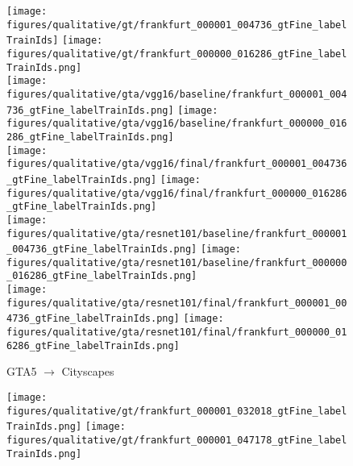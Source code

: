 \begin{figure*}[t]
\begin{subfigure}{.02\linewidth}
	\scriptsize
	\vspace{-1.2em}
	\vspace{3.2em}
	\vspace{2.5em}
\end{subfigure}%
\hspace{0.1em}%
\begin{subfigure}{.49\linewidth}
  \centering
    \texttt{[image: figures/qualitative/gt/frankfurt\_000001\_004736\_gtFine\_labelTrainIds]}
    \texttt{[image: figures/qualitative/gt/frankfurt\_000000\_016286\_gtFine\_labelTrainIds.png]}\\
	\texttt{[image: figures/qualitative/gta/vgg16/baseline/frankfurt\_000001\_004736\_gtFine\_labelTrainIds.png]}
    \texttt{[image: figures/qualitative/gta/vgg16/baseline/frankfurt\_000000\_016286\_gtFine\_labelTrainIds.png]}\\
    \texttt{[image: figures/qualitative/gta/vgg16/final/frankfurt\_000001\_004736\_gtFine\_labelTrainIds.png]}
    \texttt{[image: figures/qualitative/gta/vgg16/final/frankfurt\_000000\_016286\_gtFine\_labelTrainIds.png]}\\
    \texttt{[image: figures/qualitative/gta/resnet101/baseline/frankfurt\_000001\_004736\_gtFine\_labelTrainIds.png]}
    \texttt{[image: figures/qualitative/gta/resnet101/baseline/frankfurt\_000000\_016286\_gtFine\_labelTrainIds.png]}\\
    \texttt{[image: figures/qualitative/gta/resnet101/final/frankfurt\_000001\_004736\_gtFine\_labelTrainIds.png]}
    \texttt{[image: figures/qualitative/gta/resnet101/final/frankfurt\_000000\_016286\_gtFine\_labelTrainIds.png]}
    \caption{\scriptsize GTA5 $\rightarrow$ Cityscapes}
\end{subfigure}%
\hspace{0.3em}%
\begin{subfigure}{.49\linewidth}
  \centering
    \texttt{[image: figures/qualitative/gt/frankfurt\_000001\_032018\_gtFine\_labelTrainIds.png]}
    \texttt{[image: figures/qualitative/gt/frankfurt\_000001\_047178\_gtFine\_labelTrainIds.png]}\\

\end{subfigure}
\end{figure*}
